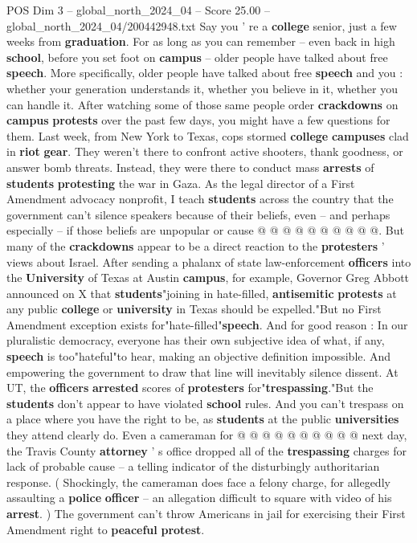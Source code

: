 \begin{textsample}{POS Dim 3 – global\_north\_2024\_04 – Score 25.00 – global\_north\_2024\_04/200442948.txt}  \label{ex:f3_pos_077}
Say you ' re a \textbf{college} senior, just a few weeks from \textbf{graduation}.
For as long as you can remember -- even back in high \textbf{school}, before you set foot on \textbf{campus} -- older people have talked about free \textbf{speech}.
More specifically, older people have talked about free \textbf{speech} and you : whether your generation understands it, whether you believe in it, whether you can handle it.
After watching some of those same people order \textbf{crackdowns} on \textbf{campus} \textbf{protests} over the past few days, you might have a few questions for them.
Last week, from New York to Texas, cops stormed \textbf{college} \textbf{campuses} clad in \textbf{riot} \textbf{gear}.
They weren't there to confront active shooters, thank goodness, or answer bomb threats.
Instead, they were there to conduct mass \textbf{arrests} of \textbf{students} \textbf{protesting} the war in Gaza.
As the legal director of a First Amendment advocacy nonprofit, I teach \textbf{students} across the country that the government can't silence speakers because of their beliefs, even -- and perhaps especially -- if those beliefs are unpopular or cause @ @ @ @ @ @ @ @ @ @.
But many of the \textbf{crackdowns} appear to be a direct reaction to the \textbf{protesters} ' views about Israel.
After sending a phalanx of state law-enforcement \textbf{officers} into the \textbf{University} of Texas at Austin \textbf{campus}, for example, Governor Greg Abbott announced on X that \textbf{students}"joining in hate-filled, \textbf{antisemitic} \textbf{protests} at any public \textbf{college} or \textbf{university} in Texas should be expelled."But no First Amendment exception exists for"hate-filled"\textbf{speech}.
And for good reason : In our pluralistic democracy, everyone has their own subjective idea of what, if any, \textbf{speech} is too"hateful"to hear, making an objective definition impossible.
And empowering the government to draw that line will inevitably silence dissent.
At UT, the \textbf{officers} \textbf{arrested} scores of \textbf{protesters} for"\textbf{trespassing}."But the \textbf{students} don't appear to have violated \textbf{school} rules.
And you can't trespass on a place where you have the right to be, as \textbf{students} at the public \textbf{universities} they attend clearly do.
Even a cameraman for @ @ @ @ @ @ @ @ @ @ next day, the Travis County \textbf{attorney} ' s office dropped all of the \textbf{trespassing} charges for lack of probable cause -- a telling indicator of the disturbingly authoritarian response. ( Shockingly, the cameraman does face a felony charge, for allegedly assaulting a \textbf{police} \textbf{officer} -- an allegation difficult to square with video of his \textbf{arrest}. ) The government can't throw Americans in jail for exercising their First Amendment right to \textbf{peaceful} \textbf{protest}.

\end{textsample}
